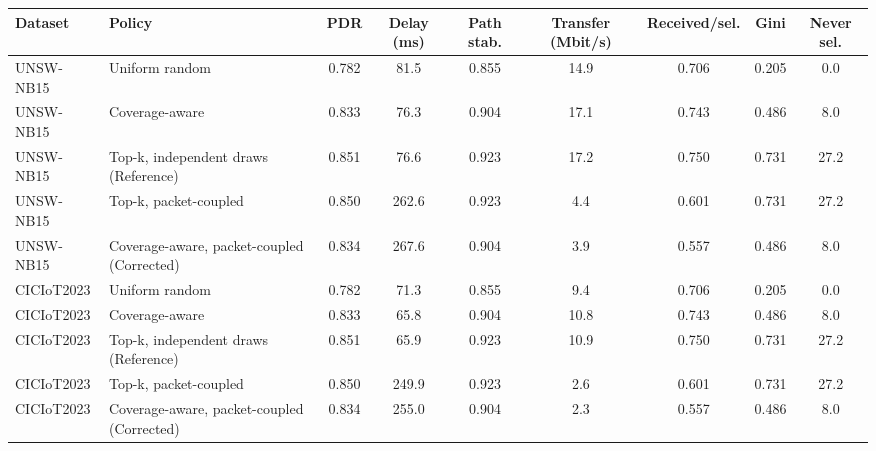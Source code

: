 \begin{tabular}{@{}llccccccc@{}}\toprule
Dataset & Policy & PDR & Delay (ms) & Path stab. & Transfer (Mbit/s) & Received/sel. & Gini & Never sel.\\\midrule
UNSW-NB15 & Uniform random & 0.782 & 81.5 & 0.855 & 14.9 & 0.706 & 0.205 & 0.0 \\
UNSW-NB15 & Coverage-aware & 0.833 & 76.3 & 0.904 & 17.1 & 0.743 & 0.486 & 8.0 \\
UNSW-NB15 & Top-k, independent draws (Reference) & 0.851 & 76.6 & 0.923 & 17.2 & 0.750 & 0.731 & 27.2 \\
UNSW-NB15 & Top-k, packet-coupled & 0.850 & 262.6 & 0.923 & 4.4 & 0.601 & 0.731 & 27.2 \\
UNSW-NB15 & Coverage-aware, packet-coupled (Corrected) & 0.834 & 267.6 & 0.904 & 3.9 & 0.557 & 0.486 & 8.0 \\
CICIoT2023 & Uniform random & 0.782 & 71.3 & 0.855 & 9.4 & 0.706 & 0.205 & 0.0 \\
CICIoT2023 & Coverage-aware & 0.833 & 65.8 & 0.904 & 10.8 & 0.743 & 0.486 & 8.0 \\
CICIoT2023 & Top-k, independent draws (Reference) & 0.851 & 65.9 & 0.923 & 10.9 & 0.750 & 0.731 & 27.2 \\
CICIoT2023 & Top-k, packet-coupled & 0.850 & 249.9 & 0.923 & 2.6 & 0.601 & 0.731 & 27.2 \\
CICIoT2023 & Coverage-aware, packet-coupled (Corrected) & 0.834 & 255.0 & 0.904 & 2.3 & 0.557 & 0.486 & 8.0 \\
\bottomrule\end{tabular}
